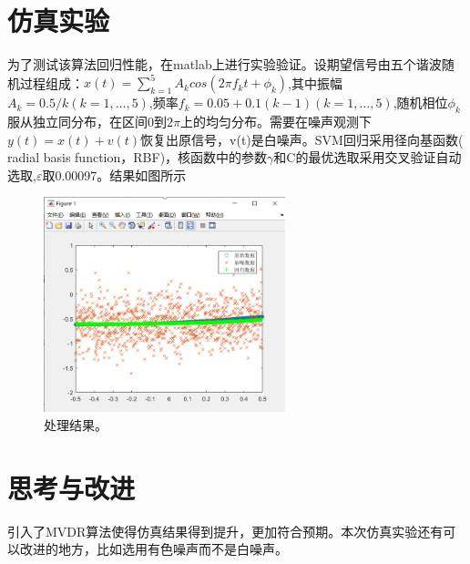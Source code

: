 \section{仿真实验}
为了测试该算法回归性能，在matlab上进行实验验证。设期望信号由五个谐波随机过程组成：$x\left(t\right)=\sum_{k=1}^{5}{A_kcos\left(2\pi f_kt+\phi_k\right)}$,其中振幅$A_k=0.5/k\left(k=1,\ldots,5\right)$,频率$f_k=0.05+0.1\left(k-1\right)\left(k=1,\ldots,5\right)$,随机相位$\phi_k$服从独立同分布，在区间0到$2\pi$上的均匀分布。需要在噪声观测下
$y\left(t\right)=x\left(t\right)+v\left(t\right)$恢复出原信号，v(t)是白噪声。SVM回归采用径向基函数( radial basis function，RBF)，核函数中的参数$\gamma$和C的最优选取采用交叉验证自动选取,$\varepsilon$取0.00097。结果如图所示
\begin{figure}[!htbp]
    \centering
    \includegraphics[width=7cm]{pic/res.png}%
    \caption{处理结果。}
    \label{fig:res}
\end{figure}


\section{思考与改进}
引入了MVDR算法使得仿真结果得到提升，更加符合预期。本次仿真实验还有可以改进的地方，比如选用有色噪声而不是白噪声。
